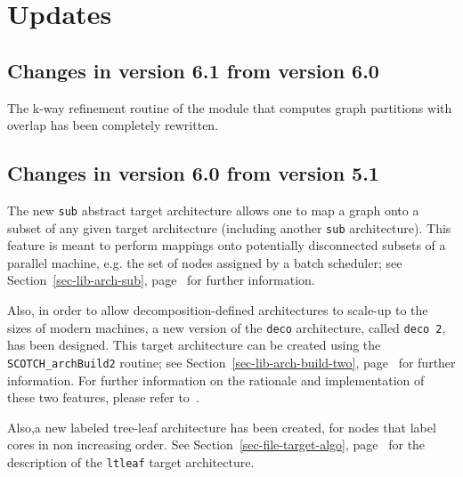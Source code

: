 
\section{Updates}
\label{sec-changes}

\subsection{Changes in version 6.1 from version 6.0}

The k-way refinement routine of the module that computes graph
partitions with overlap has been completely rewritten.

\subsection{Changes in version 6.0 from version 5.1}

The new \texttt{sub} abstract target architecture allows one to map a
graph onto a subset of any given target architecture (including
another \texttt{sub} architecture). This feature is meant to perform
mappings onto potentially disconnected subsets of a parallel machine,
e.g. the set of nodes assigned by a batch scheduler; see
Section~\ref{sec-lib-arch-sub}, page~\pageref{sec-lib-arch-sub} for
further information.

Also, in order to allow decomposition-defined architectures to
scale-up to the sizes of modern machines, a new version of the
\texttt{deco} architecture, called \texttt{deco~2}, has been
designed. This target architecture can be created using the 
\texttt{SCOTCH\_\lbt arch\lbt Build2} routine; see
Section~\ref{sec-lib-arch-build-two},
page~\pageref{sec-lib-arch-build-two} for further information.
For further information on the rationale and implementation of these
two features, please refer to~\cite{pellegrini:hal-01671156}.

Also,a new labeled tree-leaf architecture has been created, for nodes
that label cores in non increasing order. See
Section~\ref{sec-file-target-algo},
page~\pageref{sec-file-target-algo} for the description of the
\texttt{ltleaf} target architecture.
\\

